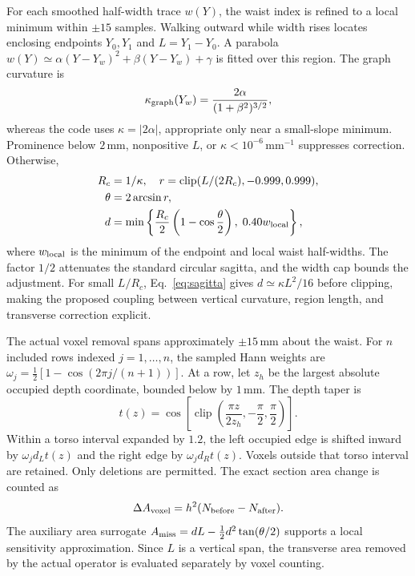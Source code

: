 \documentclass[11pt,a4paper]{article}
\numberwithin{equation}{section}
\begin{document}
For each smoothed half-width trace $w(Y)$, the waist index is refined to a local minimum within $\pm15$ samples. Walking outward while width rises locates enclosing endpoints $Y_0,Y_1$ and $L=Y_1-Y_0$. A parabola $w(Y)\simeq\alpha(Y-Y_w)^2+\beta(Y-Y_w)+\gamma$ is fitted over this region. The graph curvature is
\begin{equation}
\kappa_{\rm graph}(Y_w)=\frac{2\alpha}{(1+\beta^2)^{3/2}},
\label{eq:waist_curvature}
\end{equation}
whereas the code uses $\kappa=|2\alpha|$, appropriate only near a small-slope minimum. Prominence below $2$\,mm, nonpositive $L$, or $\kappa<10^{-6}$\,mm$^{-1}$ suppresses correction. Otherwise,
\begin{align}
R_c&=1/\kappa,\quad r=\operatorname{clip}(L/(2R_c),-0.999,0.999),\nonumber\\
\theta&=2\arcsin r,\label{eq:theta_arc}\\
d&=\min\left\{\frac{R_c}{2}\left(1-\cos\frac\theta2\right),\;0.40w_{\rm local}\right\},
\label{eq:sagitta}
\end{align}
where $w_{\rm local}$ is the minimum of the endpoint and local waist half-widths. The factor $1/2$ attenuates the standard circular sagitta, and the width cap bounds the adjustment. For small $L/R_c$, Eq.~\eqref{eq:sagitta} gives $d\simeq\kappa L^2/16$ before clipping, making the proposed coupling between vertical curvature, region length, and transverse correction explicit.

The actual voxel removal spans approximately $\pm15$\,mm about the waist. For $n$ included rows indexed $j=1,\ldots,n$, the sampled Hann weights are $\omega_j=\tfrac12[1-\cos(2\pi j/(n+1))]$. At a row, let $z_h$ be the largest absolute occupied depth coordinate, bounded below by $1$\,mm. The depth taper is
\begin{equation}
t(z)=\cos\!\left[\operatorname{clip}\left(\frac{\pi z}{2z_h},-\frac\pi2,\frac\pi2\right)\right].
\end{equation}
Within a torso interval expanded by $1.2$, the left occupied edge is shifted inward by $\omega_jd_Lt(z)$ and the right edge by $\omega_jd_Rt(z)$. Voxels outside that torso interval are retained. Only deletions are permitted. The exact section area change is counted as
\begin{equation}
\Delta A_{\rm voxel}=h^2(N_{\rm before}-N_{\rm after}).
\end{equation}
The auxiliary area surrogate $A_{\rm miss}=dL-\tfrac12d^2\tan(\theta/2)$ supports a local sensitivity approximation. Since $L$ is a vertical span, the transverse area removed by the actual operator is evaluated separately by voxel counting.
\end{document}
